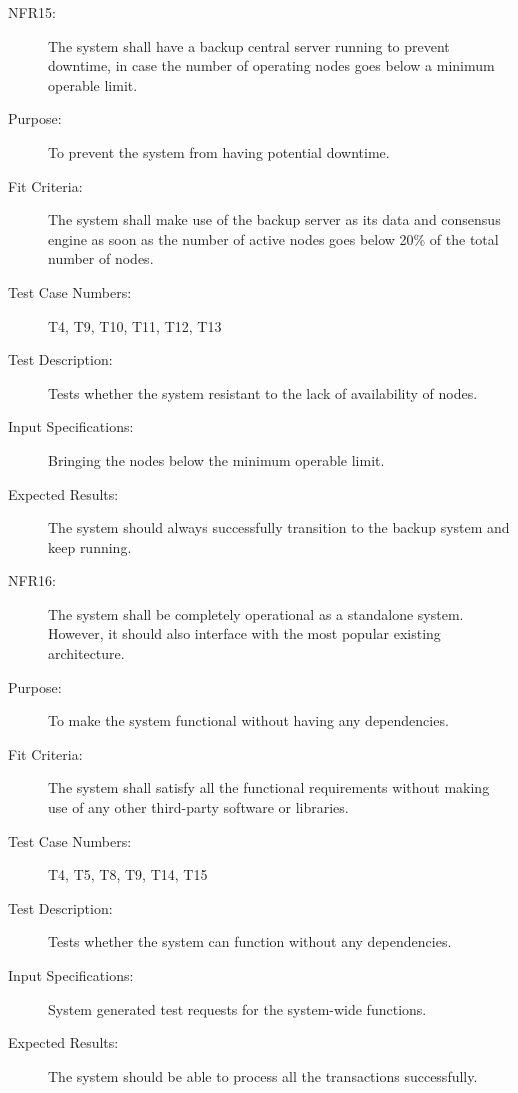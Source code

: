 \documentclass[a4paper,twoside,phd]{BYUPhys}
\begin{document}
\begin{description}
\item[NFR15:] The system shall have a backup central server running to prevent downtime, in case the number of operating nodes goes below a minimum operable limit.
\item[Purpose:] To prevent the system from having potential downtime.
\item[Fit Criteria:] The system shall make use of the backup server as its data and consensus engine as soon as the number of active nodes goes below 20\% of the total number of nodes.
\item[Test Case Numbers:] T4, T9, T10, T11, T12, T13
\item[Test Description:] Tests whether the system resistant to the lack of availability of nodes.
\item[Input Specifications:] Bringing the nodes below the minimum operable limit.
\item[Expected Results:] The system should always successfully transition to the backup system and keep running.

\item[NFR16:] The system shall be completely operational as a standalone system.  However, it should also interface with the most popular existing architecture.
\item[Purpose:] To make the system functional without having any dependencies.
\item[Fit Criteria:] The system shall satisfy all the functional requirements without making use of any other third-party software or libraries.
\item[Test Case Numbers:] T4, T5, T8, T9, T14, T15
\item[Test Description:] Tests whether the system can function without any dependencies.
\item[Input Specifications:] System generated test requests for the system-wide functions.
\item[Expected Results:] The system should be able to process all the transactions successfully.
\end{description}
\end{document}
